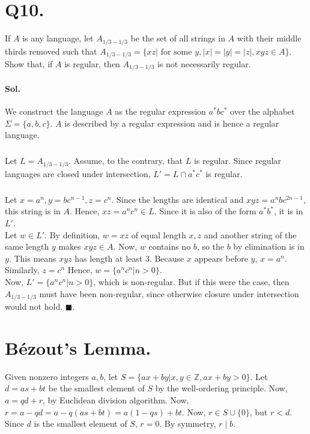 \documentclass[]{article}
\begin{document}
	\pagebreak
	
	\section*{Q10.}
	If $A$ is any language, let $A_{1/3-1/3}$ be the set of all strings in $A$ with their middle thirds removed such that $A_{1/3-1/3} = \{xz | \text{ for some } y, |x| = |y| = |z|, xyz \in A\}$. Show that, if $A$ is regular, then $A_{1/3-1/3}$ is not necessarily regular. 
	
	\paragraph{Sol.} We construct the language $A$ as the regular expression $a^* b c^*$ over the alphabet $\Sigma = \{a,b,c\}$. $A$ is described by a regular expression and is hence a regular language. 
	\subparagraph{}
	Let $L = A_{1/3-1/3}$. Assume, to the contrary, that $L$ is regular. Since regular languages are closed under intersection, $L' = L \cap a^* c^*$ is regular.
	\subparagraph{}
	Let $x = a^n, y = bc^{n-1}, z = c^n$. Since the lengths are identical and $xyz = a^n b c^{2n-1}$, this string is in $A$. Hence, $xz = a^n c^n \in L$. Since it is also of the form $a^* b^*$, it is in $L'$. \\
	Let $w \in L'$. By definition, $w=xz$ of equal length $x,z$ and another string of the same length $y$ makes $xyz \in A$. Now, $w$ contains no $b$, so the $b$ by elimination is in $y$. This means $xyz$ has length at least 3. Because $x$ appears before $y$, $x=a^n$. Similarly, $z = c^n$ Hence, $w = \{a^n c^n | n > 0\}$. \\
	Now, $L' = \{a^n c^n | n > 0\}$, which is non-regular. But if this were the case, then $A_{1/3-1/3}$ must have been non-regular, since otherwise closure under intersection would not hold. $\blacksquare$.
	
	\pagebreak
	
	\section*{Bézout's Lemma.}
	Given nonzero integers $a, b$, let $S = \{ax+by | x, y \in \mathbb{Z}, ax+by>0\}$. Let $d = as+bt$ be the smallest element of $S$ by the well-ordering principle. Now, $a=qd+r$, by Euclidean division algorithm. Now, $r = a-qd = a-q(as+bt) = a(1-qs) + bt$. Now, $r \in S \cup \{0\}$, but $r < d$. Since $d$ is the smallest element of $S$, $r=0$. By symmetry, $r \mid b$.
	
\end{document}
